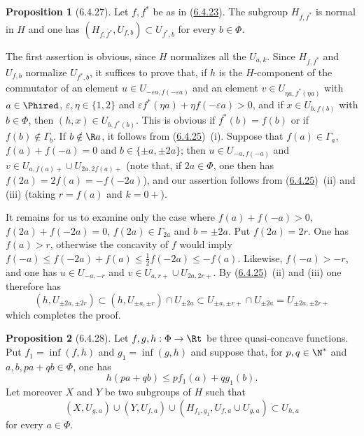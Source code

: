 \documentclass[12pt,a4paper,oneside,english]{smfart}
\makeatletter
\newcommand{\btanchor}[1]{\leavevmode\Hy@raisedlink{\hypertarget{bt:#1}{}}}
\newcommand{\btref}[1]{\hyperlink{bt:#1}{#1}}
\theoremstyle{definition}
\theoremstyle{bt}
\newtheorem{prop}{Proposition}
\makeatother
\begin{document}
\begin{prop}[6.4.27]\btanchor{6.4.27}
Let $f,f^{*}$ be as in (\btref{6.4.23}). The subgroup $H_{f,f^{*}}$ is normal in
$H$ and one has $(H_{f,f^{*}},U_{f,b})\subset U_{f^{*},b}$ for every
$b\in\Phi$.
\end{prop}

The first assertion is obvious, since $H$ normalizes all the $U_{a,k}$.
Since $H_{f,f^{*}}$ and $U_{f,b}$ normalize $U_{f^{*},b}$, it suffices to
prove that, if $h$ is the $H$-component of the commutator of an element
$u\in U_{-\varepsilon a,f(-\varepsilon a)}$ and an element
$v\in U_{\eta a,f^{*}(\eta a)}$ with $a\in\Phired$,
$\varepsilon,\eta\in\{1,2\}$ and
$\varepsilon f^{*}(\eta a)+\eta f(-\varepsilon a)>0$, and if
$x\in U_{b,f(b)}$ with $b\in\Phi$, then $(h,x)\in U_{b,f^{*}(b)}$. This is
obvious if $f^{*}(b)=f(b)$ or if $f(b)\notin\Gamma_b$. If
$b\notin\R a$, it follows from (\btref{6.4.25})~(i). Suppose that
$f(a)\in\Gamma_a$, $f(a)+f(-a)=0$ and $b\in\{\pm a,\pm2a\}$; then
$u\in U_{-a,f(-a)}$ and $v\in U_{a,f(a)+}\cup U_{2a,2f(a)+}$ (note that, if
$2a\in\Phi$, one then has $f(2a)=2f(a)=-f(-2a)$), and our assertion follows
from (\btref{6.4.25})~(ii) and (iii) (taking $r=f(a)$ and $k=0+$).

It remains for us to examine only the case where $f(a)+f(-a)>0$,
$f(2a)+f(-2a)=0$, $f(2a)\in\Gamma_{2a}$ and $b=\pm2a$. Put $f(2a)=2r$. One
has $f(a)>r$, otherwise the concavity of $f$ would imply
$f(-a)\leq f(-2a)+f(a)\leq\tfrac12 f(-2a)\leq-f(a)$. Likewise,
$f(-a)>-r$, and one has $u\in U_{-a,-r}$ and
$v\in U_{a,r+}\cup U_{2a,2r+}$. By (\btref{6.4.25})~(ii) and (iii) one therefore
has
\[
  (h,U_{\pm2a,\pm2r})\subset(h,U_{\pm a,\pm r})\cap U_{\pm2a}\subset    U_{\pm a,\pm r+}\cap U_{\pm2a}=U_{\pm2a,\pm2r+}
\]
which completes the proof.

\begin{prop}[6.4.28]\btanchor{6.4.28}
Let $f,g,h:\Phi\to\Rt$ be three quasi-concave functions. Put
$f_1=\inf(f,h)$ and $g_1=\inf(g,h)$ and suppose that, for $p,q\in\N^{*}$
and $a,b,pa+qb\in\Phi$, one has
\begin{equation}
  h(pa+qb)\leq pf_1(a)+qg_1(b).
\end{equation}
Let moreover $X$ and $Y$ be two subgroups of $H$ such that
\begin{equation}
  (X,U_{g,a})\cup(Y,U_{f,a})\cup(H_{f_1,g_1},U_{f,a}\cup U_{g,a})
   \subset U_{h,a}
\end{equation}
for every $a\in\Phi$.
\end{prop}
\par\endgroup
\end{document}
